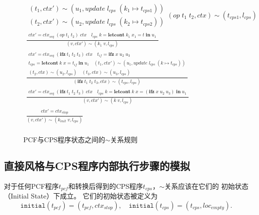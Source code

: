 \begin{figure}[htbp]
\begin{gather*}
{{\begin{matrix}
        (t_1, ctx')\sim (u_1, update\; l_{cps}\; (k_1 \mapsto t_{cps1})) \\
        (t_2, ctx')\sim (u_2, update\; l_{cps}\; (k_2 \mapsto t_{cps2})) \end{matrix}}
        {(op\; t_1\; t_2, ctx)\sim (t_{cps1}, l_{cps})}} \\
    \tag{6} \displaystyle{\frac{\begin{matrix}
        ctx'=ctx_{seq}\; (op\; t_1\; t_2)\; ctx \quad
        l_{cps}\; k = \mathbf{letcont}\; k_1\; x_1 = t\; \mathbf{in}\; u_1 \end{matrix}}
        {(v, ctx')\sim (k_1\; v, l_{cps})}} \\    
    \tag{7} \displaystyle{\frac{\begin{matrix}
        ctx'=ctx_{seq}\; (\mathbf{ ifz }\; t_1\; t_2\; t_3)\; ctx \quad
        t_{if} = \mathbf{ ifz }\; x\; u_2\; u_3 \\
        t_{cps} = \mathbf{letcont}\; k\; x = t_{if}\; \mathbf{in}\; u_1 \quad
        (t_1, ctx')\sim (u_1, update\; l_{cps}\; (k \mapsto t_{cps})) \\
        (t_2, ctx)\sim (u_2, l_{cps}) \quad (t_3, ctx)\sim (u_3, l_{cps}) \end{matrix}}
        {(\mathbf{ ifz }\; t_1\; t_2\; t_3, ctx)\sim (t_{cps}, l_{cps})}} \\
    \tag{8} \displaystyle{\frac{\begin{matrix}
        ctx'=ctx_{seq}\; (\mathbf{ ifz }\; t_1\; t_2\; t_3)\; ctx \quad
        l_{cps}\; k = \mathbf{letcont}\; k\; x = (\mathbf{ ifz }\; x\; u_2\; u_3)\; \mathbf{in}\; u_1 \end{matrix}}
        {(v, ctx')\sim (k\; v, l_{cps})}} \\
    \tag{9} \displaystyle{\frac{\begin{matrix}
        c t x' = ctx_{stop} \end{matrix}}
        {(v, ctx')\sim (k_{init}\; v, l_{cps})}} \\
    \end{gather*}
    \caption{PCF与CPS程序状态之间的$\sim$关系规则}\label{simrelationcps}
\end{figure}


\subsection{直接风格与CPS程序内部执行步骤的模拟}

对于任何PCF程序$t_{pcf}$和转换后得到的CPS程序$t_{cps}$，$\sim$关系应该在它们的
初始状态（Initial State）下成立。
它们的初始状态被定义为
\begin{equation}
\mathtt{initial}(t_{pcf}) = (t_{pcf}, ctx_{stop}),\quad
\mathtt{initial}(t_{cps}) = (t_{cps}, loc_{empty}).
\end{equation}

